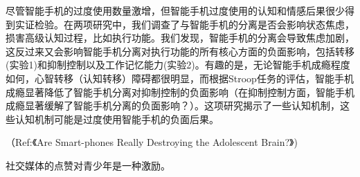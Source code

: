 尽管智能手机的过度使用数量激增，但智能手机过度使用的认知和情感后果很少得到实证检验。在两项研究中，我们调查了与智能手机的分离是否会影响状态焦虑，损害高级认知过程，比如执行功能。我们发现，智能手机的分离会导致焦虑加剧，这反过来又会影响智能手机分离对执行功能的所有核心方面的负面影响，包括转移(实验1)和抑制控制以及工作记忆能力(实验2)。有趣的是，无论智能手机成瘾程度如何，心智转移（认知转移）障碍都很明显，而根据Stroop任务的评估，智能手机成瘾显著降低了智能手机分离对抑制控制的负面影响（在抑制控制方面，智能手机成瘾显著缓解了智能手机分离的负面影响？）。这项研究揭示了一些认知机制，这些认知机制可能是过度使用智能手机的负面后果。\cite{hartanto2016smartphone}

（Ref:《Are Smart-phones Really Destroying the Adolescent Brain?》)

社交媒体的点赞对青少年是一种激励。

